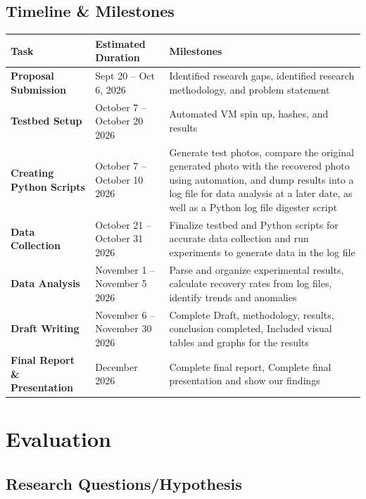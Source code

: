 \documentclass[conference]{IEEEtran}
\begin{document}
\subsection{Timeline \& Milestones}
\vspace{1em}
\begin{center}
\small
\renewcommand{\arraystretch}{1.3}
\begin{tabularx}{\columnwidth}{|C{1.9cm}|C{2.1cm}|Y|}
\hline
\textbf{Task} & \textbf{Estimated Duration} & \textbf{Milestones} \\
\hline
\textbf{Proposal Submission} & Sept 20 -- Oct 6, 2026 & Identified research gaps, identified research methodology, and problem statement \\
\hline
\textbf{Testbed Setup} & October 7 -- October 20 2026 & Automated VM spin up, hashes, and results \\
\hline
\textbf{Creating Python Scripts} & October 7 -- October 10 2026 & Generate test photos, compare the original generated photo with the recovered photo using automation, and dump results into a log file for data analysis at a later date, as well as a Python log file digester script \\
\hline
\textbf{Data Collection} & October 21 -- October 31 2026 & Finalize testbed and Python scripts for accurate data collection and run experiments to generate data in the log file \\
\hline
\textbf{Data Analysis} & November 1 -- November 5 2026 & Parse and organize experimental results, calculate recovery rates from log files, identify trends and anomalies \\
\hline
\textbf{Draft Writing} & November 6 -- November 30 2026 & Complete Draft, methodology, results, conclusion completed, Included visual tables and graphs for the results \\
\hline
\textbf{Final Report \& Presentation} & December 2026 & Complete final report, Complete final presentation and show our findings \\
\hline
\end{tabularx}
\end{center}



\section{Evaluation}
\subsection{Research Questions/Hypothesis}
\end{document}
